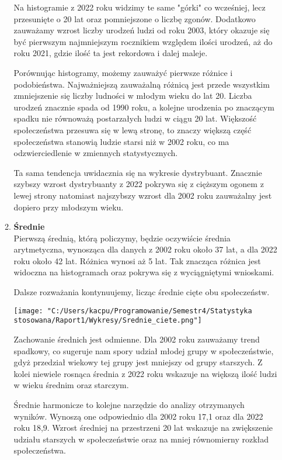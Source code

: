 \documentclass{article}
\begin{document}
\begin{enumerate}
\begin{enumerate}[label*=\arabic*.]
			Na histogramie z 2022 roku widzimy te same "górki" co wcześniej, lecz przesunięte o 20 lat oraz pomniejszone o liczbę zgonów. Dodatkowo zauważamy wzrost liczby urodzeń ludzi od roku 2003, który okazuje się być pierwszym najmniejszym rocznikiem względem ilości urodzeń, aż do roku 2021, gdzie ilość ta jest rekordowa i dalej maleje.
			
			Porównując histogramy, możemy zauważyć pierwsze różnice i podobieństwa. Najważniejszą zauważalną różnicą jest przede wszystkim zmniejszenie się liczby ludności w młodym wieku do lat 20. Liczba urodzeń znacznie spada od 1990 roku, a kolejne urodzenia po znaczącym spadku nie równoważą postarzałych ludzi w ciągu 20 lat. Większość społeczeństwa przesuwa się w lewą stronę, to znaczy większą część społeczeństwa stanowią ludzie starsi niż w 2002 roku, co ma odzwierciedlenie w zmiennych statystycznych.
			
			Ta sama tendencja uwidacznia się na wykresie dystrybuant. Znacznie szybszy wzrost dystrybuanty z 2022 pokrywa się z cięższym ogonem z lewej strony natomiast najszybszy wzrost dla 2002 roku zauważalny jest dopiero przy młodszym wieku.
			
			
			
			\item \textbf{Średnie}\\
			Pierwszą średnią, którą policzymy, będzie oczywiście średnia arytmetyczna, wynosząca dla danych z 2002 roku około 37 lat, a dla 2022 roku około 42 lat. Różnica wynosi aż 5 lat. Tak znacząca różnica jest widoczna na histogramach oraz pokrywa się z wyciągniętymi wnioskami.
			
			Dalsze rozważania kontynuujemy, licząc średnie cięte obu społeczeństw.
			
			\texttt{[image: "C:/Users/kacpu/Programowanie/Semestr4/Statystyka stosowana/Raport1/Wykresy/Srednie\_ciete.png"]}
			
			Zachowanie średnich jest odmienne. Dla 2002 roku zauważamy trend spadkowy, co sugeruje nam spory udział młodej grupy w społeczeństwie, gdyż przedział wiekowy tej grupy jest mniejszy od grupy starszych. Z kolei niewiele rosnąca średnia z 2022 roku wskazuje na większą ilość ludzi w wieku średnim oraz starczym.
			
			Średnie harmonicze to kolejne narzędzie do analizy otrzymanych wyników. Wynoszą one odpowiednio dla 2002 roku 17,1 oraz dla 2022 roku 18,9. Wzrost średniej na przestrzeni 20 lat wskazuje na zwiększenie udziału starszych w społeczeństwie oraz na mniej równomierny rozkład społeczeństwa.
			

\end{enumerate}
\end{enumerate}
\end{document}
